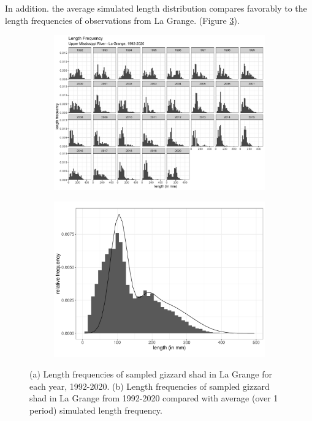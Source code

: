 \documentclass[preprint,review,12pt,authoryear]{elsarticle}
\begin{document}
In addition. the average simulated length distribution compares favorably to the length frequencies of observations from La Grange. (Figure \ref{fig:lagrange}). 
\begin{figure}
\centering
\begin{subfigure}[b]{.43\textwidth}
  \includegraphics[width=\textwidth]{figures/LTRMlg.png}
   \caption{}
  \label{fig:LTRMlg}
\end{subfigure}
\begin{subfigure}[b]{.43\textwidth}
   \includegraphics[width=\textwidth]{figures/lagrange.pdf}
     \caption{}
\label{fig:lagrange}
\end{subfigure}
\caption{(a) Length frequencies of sampled gizzard shad in La Grange for each year, 1992-2020. (b) Length frequencies of sampled gizzard shad in La Grange from 1992-2020 compared with average (over 1 period) simulated length frequency.}
\end{figure}    
\end{document}
